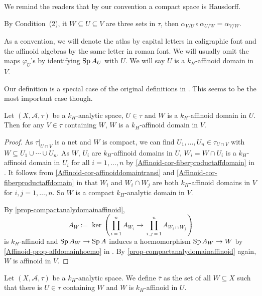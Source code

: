We remind the readers that by our convention a compact space is Hausdorff. 

By Condition~(2), it $W\subseteq U\subseteq V$ are three sets in $\tau$, then $\alpha_{V/U}\circ\alpha_{U/W}=\alpha_{V/W}$.

\begin{remark}\label{rmk-affdomainident}
    As a convention, we will denote the atlas by capital  letters in caligraphic font and the affinoid algebras by the same letter in roman font. We will usually omit the maps $\varphi_U$'s by identifying $\operatorname{Sp} A_U$ with $U$. We will say $U$ is a $k_H$-affinoid domain in $V$.    
\end{remark}


\begin{remark}
    Our definition is a special case of the original definitions in \cite{Berk93}. This seems to be the most important case though.
\end{remark}

\begin{lemma}\label{lma-innetaffinoneaffinall}
    Let $(X,\mathcal{A},\tau)$ be a $k_H$-analytic space, $U\in \tau$ and $W$ is a $k_H$-affinoid domain in $U$. Then for any $V\in \tau$ containing $W$, $W$ is a $k_H$-affinoid domain in $V$.
\end{lemma}
\begin{proof}
    As $\tau|_{U\cap V}$ is a net and $W$ is compact, we can find $U_1,\ldots,U_n\in \tau_{U\cap V}$ with $W\subseteq U_1\cup \cdots\cup  U_n$. As $W$, $U_i$ are $k_H$-affinoid domains in $U$, $W_i=W\cap U_i$ is a $k_H$-affinoid domain in $U_i$ for all $i=1,\ldots,n$ by \cref{Affinoid-cor-fiberproductaffdomain} in . It follows from \cref{Affinoid-cor-affinoiddomaintransi} and \cref{Affinoid-cor-fiberproductaffdomain} in  that $W_i$ and $W_i\cap W_j$ are both $k_H$-affinoid domains in $V$ for $i,j=1,\ldots,n$. So $W$ is a compact $k_H$-analytic domain in $V$.

    By \cref{prop-compactanalydomainaffinoid},
    \[
        A_W:=\ker  \left( \prod_{i=1}^n A_{W_i} \rightarrow \prod_{i,j=1}^n A_{W_i\cap W_j}\right)
    \]
    is $k_H$-affinoid and $\operatorname{Sp} A_W\rightarrow \operatorname{Sp} A$ induces a hoemomorphism $\operatorname{Sp} A_W\rightarrow W$ by \cref{Affinoid-prop-affdomainhoemo} in . By \cref{prop-compactanalydomainaffinoid} again, $W$ is affinoid in $V$. 
\end{proof}

\begin{definition}
    Let $(X,\mathcal{A},\tau)$ be a $k_H$-analytic space. We define $\bar{\tau}$ as the set of all $W\subseteq X$ such that there is $U\in \tau$ containing $W$ and $W$ is $k_H$-affinoid in $U$.
\end{definition}

